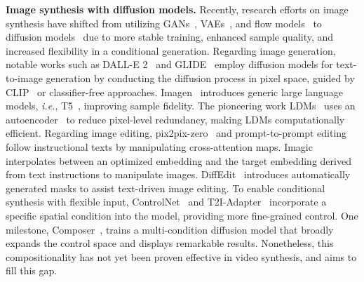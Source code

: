\textbf{Image synthesis with diffusion models.}
Recently, research efforts on image synthesis have shifted from utilizing GANs~\cite{goodfellow2020GAN}, VAEs~\cite{kingma2013VAE}, and flow models~\cite{dinh2014NICE} to diffusion models~\cite{sohl2015Diffusion_model,ho2020denoising_ddpm,zhang2022gddim,vahdat2021score_generative_latent} due to more stable training, enhanced sample quality, and increased flexibility in a conditional generation.
Regarding image generation, notable works such as DALL-E 2~\cite{ramesh2022Dalle-2} and GLIDE~\cite{nichol2021glide} employ diffusion models for text-to-image generation by conducting the diffusion process in pixel space, guided by CLIP~\cite{radford2021CLIP} or classifier-free approaches.
Imagen~\cite{saharia2022Imagen} introduces generic large language models, \textit{i.e.}, T5~\cite{raffel2020T5}, improving sample fidelity.
The pioneering work LDMs~\cite{rombach2022LDM} uses an autoencoder~\cite{PatrickEsser2021TamingTF} to reduce pixel-level redundancy, making LDMs computationally efficient.
Regarding image editing, pix2pix-zero~\cite{parmar2023pix2pix-zero} and prompt-to-prompt editing~\cite{hertz2022prompt-to-prompt} follow instructional texts by manipulating cross-attention maps.
Imagic~\cite{kawar2022Imagic} interpolates between an optimized embedding and the target embedding derived from text instructions to manipulate images.
DiffEdit~\cite{couairon2022diffedit} introduces automatically generated masks to assist text-driven image editing.
To enable conditional synthesis with flexible input, ControlNet~\cite{zhang2023controlnet} and T2I-Adapter~\cite{mou2023T2I_Adapter} incorporate a specific spatial condition into the model, providing more fine-grained control.
One milestone, Composer~\cite{huang2023composer}, trains a multi-condition diffusion model that broadly expands the control space and displays remarkable results.
Nonetheless, this compositionality has not yet been proven effective in video synthesis, and \method aims to fill this gap.

